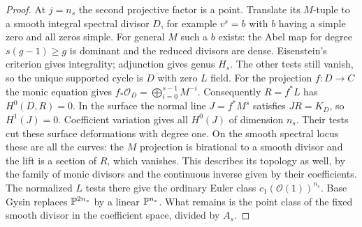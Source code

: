 \begin{proof}
At $j=n_s$ the second projective factor is a point.
Translate its $M$-tuple to a smooth integral spectral divisor $D$,
for example $v^s=b$ with $b$ having a simple zero and all zeros
simple. For general $M$ such a $b$ exists: the Abel map for degree
$s(g-1)\ge g$ is dominant and the reduced divisors are dense.
Eisenstein's criterion gives integrality; adjunction gives genus
$H_s$. The other tests still vanish, so the unique supported
cycle is $D$ with zero $L$ field. For the projection $f:D\to C$ the
monic equation gives $f_*\mathcal O_D=\bigoplus_{i=0}^{s-1}M^{-i}$.
Consequently $R=f^*L$ has $H^0(D,R)=0$. In the surface the normal
line $J=f^*M^s$ satisfies $JR=K_D$, so $H^1(J)=0$. Coefficient
variation gives all $H^0(J)$ of dimension $n_s$. Their tests cut
these surface deformations with degree one.
On the smooth spectral locus these are all the curves: the $M$ projection is
birational to a smooth divisor and the lift is a
section of $R$, which vanishes. This describes its topology as well,
by the family of monic divisors and the continuous inverse given by
their coefficients. The normalized $L$ tests there give the ordinary
Euler class $c_1(\mathcal O(1))^{n_s}$. Base Gysin replaces
$\mathbb P^{2n_s}$ by a linear $\mathbb P^{n_s}$. What remains is the point class
of the fixed smooth divisor in the coefficient space, divided by $A_s$.


\end{proof}
